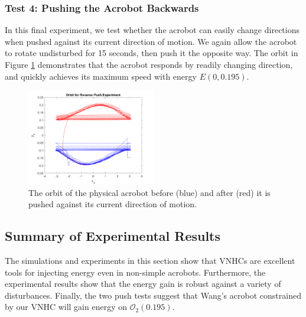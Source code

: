 \subsubsection*{Test 4: Pushing the Acrobot Backwards}
In this final experiment, we test whether the acrobot can easily change
directions when pushed against its current direction of motion.
We again allow the acrobot to rotate undisturbed for 15 seconds, then push it
the opposite way.
The orbit in Figure \ref{fig:acrobot-rpush-orbit} demonstrates that the acrobot
responds by readily changing direction, and quickly achieves its maximum speed
with energy \(E(0,0.195)\).

\begin{figure}[ht]
    \centering
    \includegraphics[width=0.5\textwidth]{images/acrobot_rpush_orbit.png}
    \caption{The orbit of the physical acrobot before (blue) and after (red) it
    is pushed against its current direction of motion.}
    \label{fig:acrobot-rpush-orbit}
\end{figure}

\subsection{Summary of Experimental Results}
The simulations and experiments in this section show that VNHCs are excellent
tools for injecting energy even in non-simple acrobots. 
Furthermore, the experimental results show that the energy gain is robust
against a variety of disturbances.
Finally, the two push tests suggest that Wang's acrobot constrained by our VNHC
will gain energy on \(\mathcal{O}_2(0.195)\).

